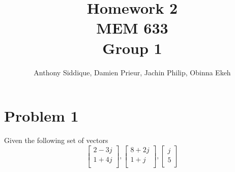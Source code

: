 \documentclass{article}
\author{Anthony Siddique, Damien Prieur, Jachin Philip, Obinna Ekeh}
\title{Homework 2\\ MEM 633 \\ Group 1}
\date{}
\begin{document}
\maketitle

\section*{Problem 1}
Given the following set of vectors
$$
\begin{bmatrix}
2-3j \\
1+4j \\
\end{bmatrix}
,
\begin{bmatrix}
8+2j \\
1+j \\
\end{bmatrix}
,
\begin{bmatrix}
j \\
5 \\
\end{bmatrix}
$$
\end{document}
